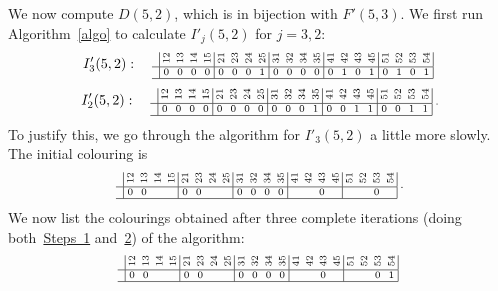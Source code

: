 \documentclass[ALCO,ThmDefs,Unicode,epreuves]{cedram}
\newcommand{\rt}[1]{\rotatebox{90}{#1}}
\begin{document}
\begin{exam}\label{ex:D52}
We now compute $D(5,2)$, which is in bijection with $F'(5,3)$. We
first run Algorithm~\ref{algo} to calculate
$I'_j(5,2)$ for $j=3,2$:
\[
 I'_3(5,2): \quad
\text{\setlength{\arraycolsep}{2.7pt}\scriptsize
$\displaystyle 
\begin{array}{c|cccc|cccc|cccc|cccc|cccc|}
 &\rt{12}&\rt{13}&\rt{14}&\rt{15}&\rt{21} &\rt{23}&\rt{24}&\rt{25}
 &\rt{31}&\rt{32} &\rt{34}&\rt{35}&\rt{41}&\rt{42}&\rt{43} &\rt{45} 
 &\rt{51}&\rt{52}&\rt{53} &\rt{54} \\ \hline
 &0&0&0	&0	&0&0&0	&1	 &0&0&0&0	&0&1&0&1 &0&1 &0&1
 \\ 
 \hline
\end{array}\; $} 
\]
\[
 I'_2(5,2): \quad
\text{\setlength{\arraycolsep}{2.7pt}\scriptsize
$\displaystyle 
\begin{array}{c|cccc|cccc|cccc|cccc|cccc|}
 &\rt{12}&\rt{13}&\rt{14}&\rt{15}&\rt{21} &\rt{23}&\rt{24}&\rt{25}&\rt{31}&\rt{32} &\rt{34}&\rt{35}&\rt{41}&\rt{42}&\rt{43} &\rt{45} 
 &\rt{51}&\rt{52}&\rt{53} &\rt{54} \\ \hline
 &0&0&0	&0	 &0&0&0&0&0&0&0	&1	&0&0&1&1	&0&0 &1&1
 \\ 
 \hline
\end{array}\;.$} 
\]
To justify this, we go through the algorithm for $I'_3(5,2)$ a little
more slowly. The initial colouring is
 \[ 
\text{\setlength{\arraycolsep}{2.7pt}\scriptsize
$\displaystyle 
\begin{array}{c|cccc|cccc|cccc|cccc|cccc|}
 &\rt{12}&\rt{13}&\rt{14}&\rt{15}&\rt{21} &\rt{23}&\rt{24}
 &\rt{25}&\rt{31}&\rt{32} &\rt{34}&\rt{35}&\rt{41}&\rt{42}&\rt{43} &\rt{45} 
 &\rt{51}&\rt{52}&\rt{53} &\rt{54} \\ \hline 
 &0&0&	&	&0&0&&	&0	&0&0&0	&	&&0&	& &&0&	\\ 
 \hline
\end{array}\; .$}
\] 
We now list the colourings obtained after three complete iterations
(doing both~\hyperlink{prop6.13_S1}{Steps~1} and~\hyperlink{prop6.13_S2}{2}) of the algorithm:
 \[ 
\text{\setlength{\arraycolsep}{2.7pt}\scriptsize
$\displaystyle 
\begin{array}{c|cccc|cccc|cccc|cccc|cccc|}
 &\rt{12}&\rt{13}&\rt{14}&\rt{15}&\rt{21} &\rt{23}&\rt{24}&\rt{25}&\rt{31}&\rt{32} &\rt{34}&\rt{35}&\rt{41}&\rt{42}&\rt{43} &\rt{45} 
 &\rt{51}&\rt{52}&\rt{53} &\rt{54} \\ \hline 
 &0&0&		&	&0&0&&	&0	&0&0&0	&	&&0&	&		&&0&1			\\ 
 \hline
\end{array}\;$} 
\]
\end{exam}
\end{document}

